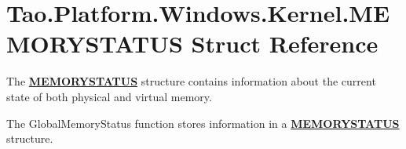 \hypertarget{struct_tao_1_1_platform_1_1_windows_1_1_kernel_1_1_m_e_m_o_r_y_s_t_a_t_u_s}{
\section{Tao.Platform.Windows.Kernel.MEMORYSTATUS Struct Reference}
\label{struct_tao_1_1_platform_1_1_windows_1_1_kernel_1_1_m_e_m_o_r_y_s_t_a_t_u_s}
}


The {\bfseries \hyperlink{struct_tao_1_1_platform_1_1_windows_1_1_kernel_1_1_m_e_m_o_r_y_s_t_a_t_u_s}{MEMORYSTATUS}} structure contains information about the current state of both physical and virtual memory. 

The GlobalMemoryStatus function stores information in a {\bfseries \hyperlink{struct_tao_1_1_platform_1_1_windows_1_1_kernel_1_1_m_e_m_o_r_y_s_t_a_t_u_s}{MEMORYSTATUS}} structure.  


